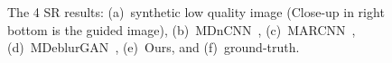 \documentclass[runningheads]{llncs}
\begin{document}
\begin{figure}[t]
{\begin{minipage}[b]{.16\columnwidth}
  \end{minipage}
}
\hspace{-3ex}
  \caption{The 4 SR results: (a)~synthetic low quality image (Close-up in right bottom is the guided image), (b)~MDnCNN~\cite{zhang2017beyond}, (c)~MARCNN~\cite{Dong2015ICCV}, (d)~MDeblurGAN~\cite{DeblurGAN}, (e)~Ours, and (f)~ground-truth.}
  \label{fig:x4}
\end{figure}
\end{document}

